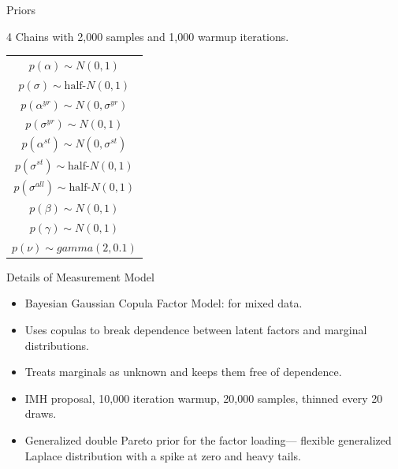 \documentclass[12pt]{beamer}
\begin{document}


\begin{frame}{Priors}

4 Chains with 2,000 samples and 1,000 warmup iterations. 

\begin{table} %

 \begin{center}
\begin{tabular}{c} 
$ p(\alpha) \sim N(0, 1)$  \\
$ p(\sigma) \sim \mbox{half-}N(0, 1) $ \\
$ p(\alpha^{yr}) \sim N(0, \sigma^{yr}) $ \\ 
$ p(\sigma^{yr}) \sim N(0, 1) $ \\
$ p(\alpha^{st}) \sim N(0, \sigma^{st}) $ \\ 
$ p(\sigma^{st}) \sim \mbox{half-}N(0, 1) $ \\ 
$ p(\sigma^{all}) \sim \mbox{half-}N(0, 1) $ \\
$ p(\beta) \sim N(0, 1) $ \\
$ p(\gamma) \sim N(0, 1) $ \\ 
$ p(\nu) \sim gamma(2, 0.1)$ 
\end{tabular} 
\end{center} 
\label{tab:priors}
\end{table} 


\end{frame}



\begin{frame}{Details of Measurement Model}

\begin{itemize}
\item Bayesian Gaussian Copula Factor Model: for mixed data. 
\item Uses copulas to break dependence between latent factors and marginal distributions. 
\item Treats marginals as unknown and keeps them free of dependence. 
\item IMH proposal, 10,000 iteration warmup, 20,000 samples, thinned every 20 draws. 
\item Generalized double Pareto prior for the factor loading--- flexible generalized Laplace distribution with a spike at zero and heavy tails. 
\end{itemize} 


\end{frame}
\end{document}

